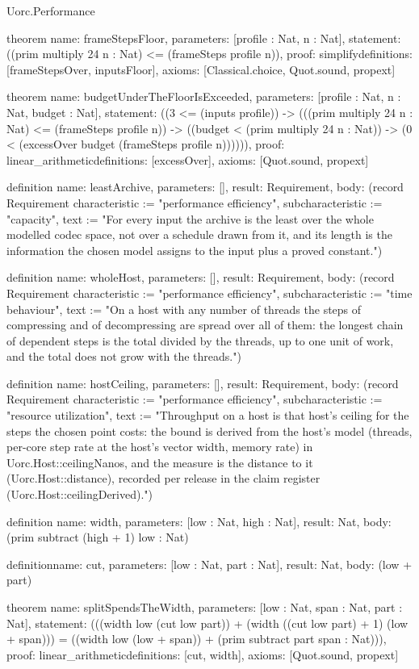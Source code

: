 \begin{lexlean}{Uorc.Performance}
\begin{semanticmodule}
theorem{
  name: frameStepsFloor,
  parameters: [profile : Nat, n : Nat],
  statement: ((prim multiply 24 n : Nat) <= (frameSteps profile n)),
  proof: simplify{definitions: [frameStepsOver, inputsFloor]},
  axioms: [Classical.choice, Quot.sound, propext]
}

theorem{
  name: budgetUnderTheFloorIsExceeded,
  parameters: [profile : Nat, n : Nat, budget : Nat],
  statement: ((3 <= (inputs profile)) -> (((prim multiply 24 n : Nat) <= (frameSteps profile n)) -> ((budget < (prim multiply 24 n : Nat)) -> (0 < (excessOver budget (frameSteps profile n)))))),
  proof: linear_arithmetic{definitions: [excessOver]},
  axioms: [Quot.sound, propext]
}

definition{
  name: leastArchive,
  parameters: [],
  result: Requirement,
  body: (record Requirement {characteristic := "performance efficiency", subcharacteristic := "capacity", text := "For every input the archive is the least over the whole modelled codec space, not over a schedule drawn from it, and its length is the information the chosen model assigns to the input plus a proved constant."})
}

definition{
  name: wholeHost,
  parameters: [],
  result: Requirement,
  body: (record Requirement {characteristic := "performance efficiency", subcharacteristic := "time behaviour", text := "On a host with any number of threads the steps of compressing and of decompressing are spread over all of them: the longest chain of dependent steps is the total divided by the threads, up to one unit of work, and the total does not grow with the threads."})
}

definition{
  name: hostCeiling,
  parameters: [],
  result: Requirement,
  body: (record Requirement {characteristic := "performance efficiency", subcharacteristic := "resource utilization", text := "Throughput on a host is that host's ceiling for the steps the chosen point costs: the bound is derived from the host's model (threads, per-core step rate at the host's vector width, memory rate) in Uorc.Host::ceilingNanos, and the measure is the distance to it (Uorc.Host::distance), recorded per release in the claim register (Uorc.Host::ceilingDerived)."})
}

definition{
  name: width,
  parameters: [low : Nat, high : Nat],
  result: Nat,
  body: (prim subtract (high + 1) low : Nat)
}

definition{name: cut, parameters: [low : Nat, part : Nat], result: Nat, body: (low + part)}

theorem{
  name: splitSpendsTheWidth,
  parameters: [low : Nat, span : Nat, part : Nat],
  statement: (((width low (cut low part)) + (width ((cut low part) + 1) (low + span))) = ((width low (low + span)) + (prim subtract part span : Nat))),
  proof: linear_arithmetic{definitions: [cut, width]},
  axioms: [Quot.sound, propext]
}


\end{semanticmodule}
\end{lexlean}
